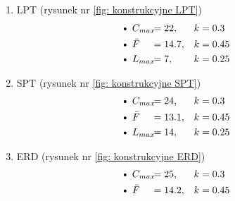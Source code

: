 \begin{multicols*}{2}
    \raggedcolumns
    \begin{enumerate}
        \item LPT (rysunek nr \ref{fig: konstrukcyjne LPT})
            \begin{align*}
                \hspace*{-0.7cm}\text{\textbullet}\ &C_{max} &\hspace*{-0.5cm}&= 22, & &k =  0.3 \\
                \hspace*{-0.7cm}\text{\textbullet}\ &\bar{F} &\hspace*{-0.5cm}&= 14.7, & &k =  0.45 \\
                \hspace*{-0.7cm}\text{\textbullet}\ &L_{max} &\hspace*{-0.5cm}&= 7, & &k = 0.25
            \end{align*}
        \item SPT (rysunek nr \ref{fig: konstrukcyjne SPT})
            \begin{align*}
                \hspace*{-0.7cm}\text{\textbullet}\ &C_{max} &\hspace*{-0.5cm}&= 24, & &k =  0.3 \\
                \hspace*{-0.7cm}\text{\textbullet}\ &\bar{F} &\hspace*{-0.5cm}&= 13.1, & &k =  0.45 \\
                \hspace*{-0.7cm}\text{\textbullet}\ &L_{max} &\hspace*{-0.5cm}&= 14, & &k = 0.25
            \end{align*}
        \item ERD (rysunek nr \ref{fig: konstrukcyjne ERD})
            \begin{align*}
                \hspace*{-0.7cm}\text{\textbullet}\ &C_{max} &\hspace*{-0.5cm}&= 25, & &k =  0.3 \\
                \hspace*{-0.7cm}\text{\textbullet}\ &\bar{F} &\hspace*{-0.5cm}&= 14.2, & &k =  0.45 \\

\end{align*}
\end{enumerate}
\end{multicols*}
